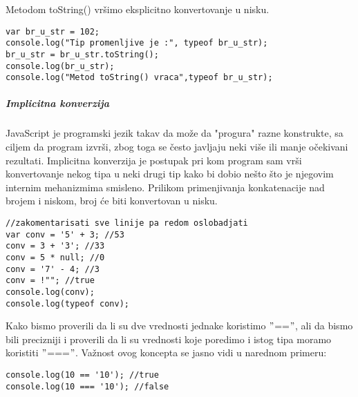 Metodom toString() vršimo eksplicitno konvertovanje u nisku.
\begin{lstlisting}[backgroundcolor = \color{lightgray}, breaklines=true]
var br_u_str = 102;
console.log("Tip promenljive je :", typeof br_u_str);
br_u_str = br_u_str.toString();
console.log(br_u_str);
console.log("Metod toString() vraca",typeof br_u_str);
\end{lstlisting}

\subparagraph{Implicitna konverzija}
JavaScript je programski jezik takav da može da "progura" razne konstrukte, sa ciljem da program izvrši, zbog toga se često javljaju neki više ili manje očekivani rezultati. Implicitna konverzija je postupak pri kom program sam vrši konvertovanje nekog tipa u neki drugi tip kako bi dobio nešto što je njegovim internim mehanizmima smisleno. Prilikom primenjivanja konkatenacije nad brojem i niskom, broj će biti konvertovan u nisku.
\begin{lstlisting}[backgroundcolor = \color{lightgray}, breaklines=true]
//zakomentarisati sve linije pa redom oslobadjati 
var conv = '5' + 3; //53
conv = 3 + '3'; //33
conv = 5 * null; //0
conv = '7' - 4; //3 
conv = !""; //true 
console.log(conv);
console.log(typeof conv);
\end{lstlisting}
Kako bismo proverili da li su dve vrednosti jednake koristimo $"$==$"$, ali da bismo bili precizniji i proverili da li su vrednosti koje poredimo i istog tipa moramo koristiti $"$===$"$. Važnost ovog koncepta se jasno vidi u narednom primeru:
\begin{lstlisting}[backgroundcolor = \color{lightgray}, breaklines=true]
console.log(10 == '10'); //true
console.log(10 === '10'); //false
\end{lstlisting}

